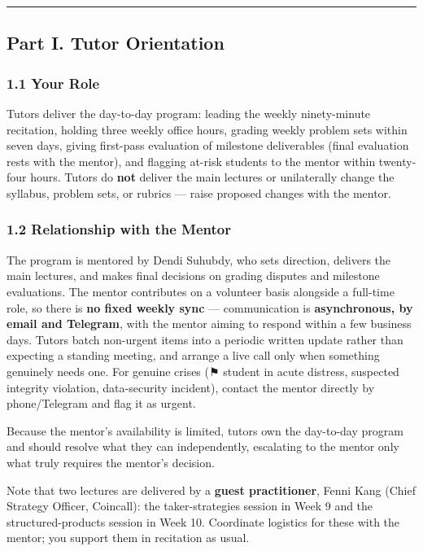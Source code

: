 \documentclass[
]{article}
\begin{document}
\begin{center}\rule{0.5\linewidth}{0.5pt}\end{center}

\subsection{Part I. Tutor Orientation}\label{part-i.-tutor-orientation}

\subsubsection{1.1 Your Role}\label{your-role}

Tutors deliver the day-to-day program: leading the weekly ninety-minute
recitation, holding three weekly office hours, grading weekly problem
sets within seven days, giving first-pass evaluation of milestone
deliverables (final evaluation rests with the mentor), and flagging
at-risk students to the mentor within twenty-four hours. Tutors do
\textbf{not} deliver the main lectures or unilaterally change the
syllabus, problem sets, or rubrics --- raise proposed changes with the
mentor.

\subsubsection{1.2 Relationship with the
Mentor}\label{relationship-with-the-mentor}

The program is mentored by Dendi Suhubdy, who sets direction, delivers
the main lectures, and makes final decisions on grading disputes and
milestone evaluations. The mentor contributes on a volunteer basis
alongside a full-time role, so there is \textbf{no fixed weekly sync}
--- communication is \textbf{asynchronous, by email and Telegram}, with
the mentor aiming to respond within a few business days. Tutors batch
non-urgent items into a periodic written update rather than expecting a
standing meeting, and arrange a live call only when something genuinely
needs one. For genuine crises (⚑ student in acute distress, suspected
integrity violation, data-security incident), contact the mentor
directly by phone/Telegram and flag it as urgent.

Because the mentor's availability is limited, tutors own the day-to-day
program and should resolve what they can independently, escalating to
the mentor only what truly requires the mentor's decision.

Note that two lectures are delivered by a \textbf{guest practitioner},
Fenni Kang (Chief Strategy Officer, Coincall): the taker-strategies
session in Week 9 and the structured-products session in Week 10.
Coordinate logistics for these with the mentor; you support them in
recitation as usual.
\end{document}
